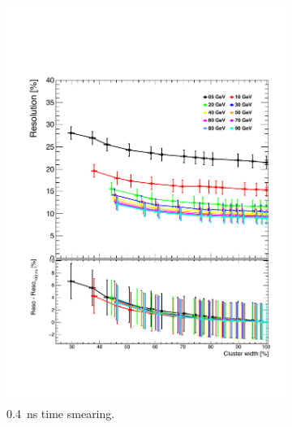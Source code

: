\begin{figure}[htbp!]
  \centering
  \begin{minipage}{1\textwidth}
    \begin{subfigure}[t]{0.5\textwidth}
      \centering
      \includegraphics[width=1\linewidth]{chap6/fig_TimingILD/0.4ns_Smearing/ShowerWidth_Resolution_Smearing0.4ns}
      \vspace{-6ex}
      \caption{\SI{0.4}{\nano\second} time smearing.} \label{fig:WidthReso0.4ns}
    \end{subfigure}
    \begin{subfigure}[t]{0.5\textwidth}
      \centering

\end{subfigure}
\end{minipage}
\end{figure}
